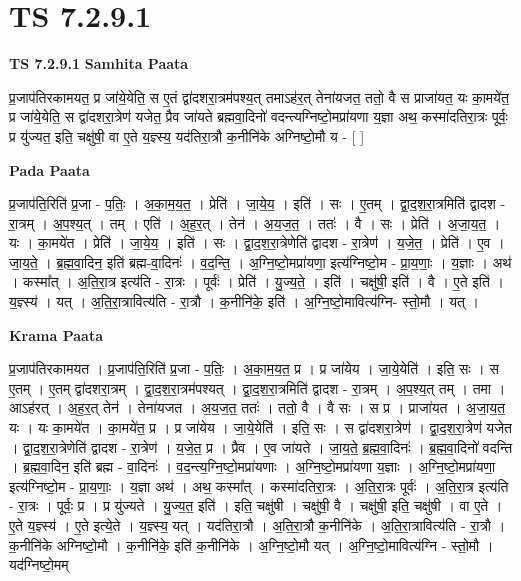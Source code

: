 \documentclass[17pt]{extarticle}
\begin{document}
\section{ TS 7.2.9.1 }

\textbf{TS 7.2.9.1 } \newline
\textbf{Samhita Paata} \newline

प्र॒जाप॑तिरकामयत॒ प्र जा॑ये॒येति॒ स ए॒तं द्वा॑दशरा॒त्रम॑पश्य॒त् तमाऽह॑र॒त् तेना॑यजत॒ ततो॒ वै स प्राजा॑यत॒ यः का॒मये॑त॒ प्र जा॑ये॒येति॒ स द्वा॑दशरा॒त्रेण॑ यजेत॒ प्रैव जा॑यते ब्रह्मवा॒दिनो॑ वदन्त्यग्निष्टो॒मप्रा॑यणा य॒ज्ञा अथ॒ कस्मा॑दतिरा॒त्रः पूर्वः॒ प्र यु॑ज्यत॒ इति॒ चक्षु॑षी॒ वा ए॒ते य॒ज्ञ्स्य॒ यद॑तिरा॒त्रौ क॒नीनि॑के अग्निष्टो॒मौ य - [  ] \newline

\textbf{Pada Paata} \newline

प्र॒जाप॑ति॒रिति॑ प्र॒जा - प॒तिः॒ । अ॒का॒म॒य॒त॒ । प्रेति॑ । जा॒ये॒य॒ । इति॑ । सः । ए॒तम् । द्वा॒द॒श॒रा॒त्रमिति॑ द्वादश - रा॒त्रम् । अ॒प॒श्य॒त् । तम् । एति॑ । अ॒ह॒र॒त् । तेन॑ । अ॒य॒ज॒त॒ । ततः॑ । वै । सः । प्रेति॑ । अ॒जा॒य॒त॒ । यः । का॒मये॑त । प्रेति॑ । जा॒ये॒य॒ । इति॑ । सः । द्वा॒द॒श॒रा॒त्रेणेति॑ द्वादश - रा॒त्रेण॑ । य॒जे॒त॒ । प्रेति॑ । ए॒व । जा॒य॒ते॒ । ब्र॒ह्म॒वा॒दिन॒ इति॑ ब्रह्म-वा॒दिनः॑ । व॒द॒न्ति॒ । अ॒ग्नि॒ष्टो॒मप्रा॑यणा॒ इत्य॑ग्निष्टो॒म - प्रा॒य॒णाः॒ । य॒ज्ञाः । अथ॑ । कस्मा᳚त् । अ॒ति॒रा॒त्र इत्य॑ति - रा॒त्रः । पूर्वः॑ । प्रेति॑ । यु॒ज्य॒ते॒ । इति॑ । चक्षु॑षी॒ इति॑ । वै । ए॒ते इति॑ । य॒ज्ञ्स्य॑ । यत् । अ॒ति॒रा॒त्रावित्य॑ति - रा॒त्रौ । क॒नीनि॑के॒ इति॑ । अ॒ग्नि॒ष्टो॒मावित्य॑ग्नि- स्तो॒मौ । यत् ।  \newline


\textbf{Krama Paata} \newline

प्र॒जाप॑तिरकामयत । प्र॒जाप॑ति॒रिति॑ प्र॒जा - प॒तिः॒ । अ॒का॒म॒य॒त॒ प्र । प्र जा॑येय । जा॒ये॒येति॑ । इति॒ सः । स ए॒तम् । ए॒तम् द्वा॑दशरा॒त्रम् । द्वा॒द॒श॒रा॒त्रम॑पश्यत् । द्वा॒द॒श॒रा॒त्रमिति॑ द्वादश - रा॒त्रम् । अ॒प॒श्य॒त् तम् । तमा । आऽह॑रत् । अ॒ह॒र॒त् तेन॑ । तेना॑यजत । अ॒य॒ज॒त॒ ततः॑ । ततो॒ वै । वै सः । स प्र । प्राजा॑यत । अ॒जा॒य॒त॒ यः । यः का॒मये॑त । का॒मये॑त॒ प्र । प्र जा॑येय । जा॒ये॒येति॑ । इति॒ सः । स द्वा॑दशरा॒त्रेण॑ । द्वा॒द॒श॒रा॒त्रेण॑ यजेत । द्वा॒द॒श॒रा॒त्रेणेति॑ द्वादश - रा॒त्रेण॑ । य॒जे॒त॒ प्र । प्रैव । ए॒व जा॑यते । जा॒य॒ते॒ ब्र॒ह्म॒वा॒दिनः॑ । ब्र॒ह्म॒वा॒दिनो॑ वदन्ति । ब्र॒ह्म॒वा॒दिन॒ इति॑ ब्रह्म - वा॒दिनः॑ । व॒द॒न्त्य॒ग्नि॒ष्टो॒मप्रा॑यणाः । अ॒ग्नि॒ष्टो॒मप्रा॑यणा य॒ज्ञाः । अ॒ग्नि॒ष्टो॒मप्रा॑यणा॒ इत्य॑ग्निष्टो॒म - प्रा॒य॒णाः॒ । य॒ज्ञा अथ॑ । अथ॒ कस्मा᳚त् । कस्मा॑दतिरा॒त्रः । अ॒ति॒रा॒त्रः पूर्वः॑ । अ॒ति॒रा॒त्र इत्य॑ति - रा॒त्रः । पूर्वः॒ प्र । प्र यु॑ज्यते । यु॒ज्य॒त॒ इति॑ । इति॒ चक्षु॑षी । चक्षु॑षी॒ वै । चक्षु॑षी॒ इति॒ चक्षु॑षी । वा ए॒ते । ए॒ते य॒ज्ञ्स्य॑ । ए॒ते इत्ये॒ते । य॒ज्ञ्स्य॒ यत् । यद॑तिरा॒त्रौ । अ॒ति॒रा॒त्रौ क॒नीनि॑के । अ॒ति॒रा॒त्रावित्य॑ति - रा॒त्रौ । क॒नीनि॑के अग्निष्टो॒मौ । क॒नीनि॑के॒ इति॑ क॒नीनि॑के । अ॒ग्नि॒ष्टो॒मौ यत् । अ॒ग्नि॒ष्टो॒मावित्य॑ग्नि - स्तो॒मौ । यद॑ग्निष्टो॒मम् \newline
\end{document}
